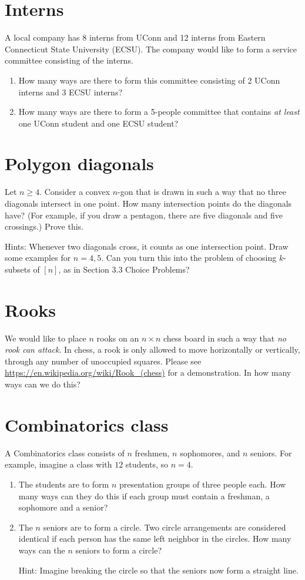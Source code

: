 \documentclass[12pt]{amsart}
\begin{document}
\section{Interns}
A local company has 8 interns from UConn and 12 interns from Eastern Connecticut State University (ECSU). The company would like to form a service committee consisting of the interns. 

\begin{enumerate}
\item How many ways are there to form this committee consisting of 2 UConn interns and 3 ECSU interns? 
\item How many ways are there to form a 5-people committee that contains \emph{at least} one UConn student and one ECSU student?
\end{enumerate}



\section{Polygon diagonals}
Let $n\geq 4$. Consider a convex $n$-gon that is drawn in such a way that no three diagonals intersect in one point. How many intersection points do the diagonals have? (For example, if you draw a pentagon, there are five diagonals and five crossings.) Prove this. 

{\tiny \noindent Hints: 
 Whenever two diagonals cross, it counts as one intersection point. Draw some examples for $n=4,5$. Can you turn this into the problem of choosing $k$-subsets of $[n]$, as in Section 3.3 Choice Problems?}


\section{Rooks}
We would like to place $n$ rooks on an $n\times n$ chess board in such a way that \emph{no rook can attack}. 
In chess, a rook is only allowed to move horizontally or vertically, through any number of unoccupied squares. Please see \url{https://en.wikipedia.org/wiki/Rook_(chess)} for a demonstration. 
In how many ways can we do this? 



\section{Combinatorics class}\label{sec:combinatorics}
A Combinatorics class consists of $n$ freshmen, $n$ sophomores, and $n$ seniors. For example, imagine a class with $12$ students, so $n=4$.

\begin{enumerate}
\item The students are to form $n$ presentation groups of three people each. How many ways can they do this if each group must contain a freshman, a sophomore and a senior?
\item The $n$ seniors are to form a circle. Two circle arrangements are considered identical if each person has the same left neighbor in the circles. How many ways can the $n$ seniors to form a circle? 

{\tiny Hint: 
Imagine breaking the circle so that the seniors now form a straight line.}
 \end{enumerate}
\end{document}
